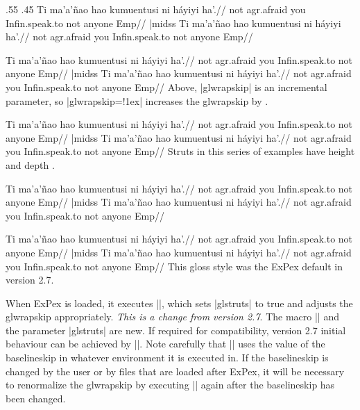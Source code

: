 \setss .55 .45
\beginss
\ex
\baselineskip=20pt
\normalglwrapskips
\begingl
\gla Ti ma'a'\~nao hao kumuentusi
   ni h\'ayiyi ha'.//
\glb not agr.afraid you
   Infin.speak.to not anyone Emp//
\endgl
\xe|midss
\ex
\baselineskip=20pt
\normalglwrapskips
\begingl
\gla Ti ma'a'\~nao hao kumuentusi
   ni h\'ayiyi ha'.//
\glb not agr.afraid you
   Infin.speak.to not anyone Emp//
\endgl
\xe
\endss

\beginss
\ex
\baselineskip=20pt
\normalglwrapskips
\begingl[glwrapskip=!1ex]
\gla Ti ma'a'\~nao hao kumuentusi
   ni h\'ayiyi ha'.//
\glb not agr.afraid you
   Infin.speak.to not anyone Emp//
\endgl
\xe|midss
\ex
\baselineskip=20pt
\normalglwrapskips
\begingl[glwrapskip=!1ex]
\gla Ti ma'a'\~nao hao kumuentusi
   ni h\'ayiyi ha'.//
\glb not agr.afraid you
   Infin.speak.to not anyone Emp//
\endgl
\xe
\endss
Above, |glwrapskip| is an incremental parameter, so |glwrapskip=!1ex|
increases the glwrapskip by \textdim{1 ex}.

\beginss
\ex
\baselineskip=14pt
\normalglwrapskips
\begingl
\gla Ti ma'a'\~nao hao kumuentusi
   ni h\'ayiyi ha'.//
\glb not agr.afraid you
   Infin.speak.to not anyone Emp//
\endgl
\xe|midss
\ex
\baselineskip=14pt
\normalglwrapskips
\begingl
\gla Ti ma'a'\~nao hao kumuentusi
   ni h\'ayiyi ha'.//
\glb not agr.afraid you
   Infin.speak.to not anyone Emp//
\endgl
\xe
\endss
Struts in this series of examples have height \textdim{10 pt} and
depth \textdim{4 pt}.

\beginss
\baselineskip=18pt
\begingl[glstruts=true,
   glwrapskip=4pt]
\gla Ti ma'a'\~nao hao kumuentusi
   ni h\'ayiyi ha'.//
\glb not agr.afraid you
   Infin.speak.to not anyone Emp//
\endgl
\xe|midss
\ex
\baselineskip=18pt
\begingl[glstruts=true,
   glwrapskip=4pt]
\gla Ti ma'a'\~nao hao kumuentusi
   ni h\'ayiyi ha'.//
\glb not agr.afraid you
   Infin.speak.to not anyone Emp//
\endgl
\xe
\endss

\beginss
\ex
\baselineskip=14pt
\begingl[glstruts=false,
   glwrapskip=1ex]
\gla Ti ma'a'\~nao hao kumuentusi
   ni h\'ayiyi ha'.//
\glb not agr.afraid you
   Infin.speak.to not anyone Emp//
\endgl
\xe
|midss
\ex
\baselineskip=14pt
\begingl[glstruts=false,
   glwrapskip=1ex]
\gla Ti ma'a'\~nao hao kumuentusi
   ni h\'ayiyi ha'.//
\glb not agr.afraid you
   Infin.speak.to not anyone Emp//
\endgl
\xe
\endss
This gloss style was the ExPex default in version 2.7.


When ExPex is loaded, it executes |\normalglwrapskips|, which
sets |glstruts| to true and adjusts the glwrapskip appropriately.
{\it This is a change from version 2.7}.  The macro
\hbox{|\normalglwrapskips|} and the parameter |glstruts| are new.
If required for compatibility, version 2.7 initial behaviour can
be achieved by ||.  Note
carefully that |\normalglwrapskips| uses the value of the
baselineskip in whatever environment it is executed in.  If the
baselineskip is changed by the user or by files that are loaded
after ExPex, it will be necessary to renormalize the glwrapskip by
executing |\normalglwrapskips| again after the baselineskip has
been changed.

